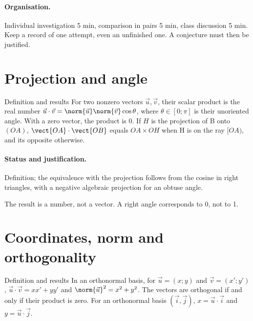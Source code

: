 \paragraph{Organisation.} Individual investigation 5 min, comparison in pairs 5 min, class discussion 5 min. Keep a record of one attempt, even an unfinished one. A conjecture must then be justified.
\section{Projection and angle}\label{C03-U1}
\begin{repere}{Definition and results}
For two nonzero vectors $\vec u,\vec v$, their scalar product is the real number $\vec u\cdot\vec v=\norm{\vec u}\norm{\vec v}\cos\theta$, where $\theta\in[0;\pi]$ is their unoriented angle. With a zero vector, the product is 0. If $H$ is the projection of B onto $(OA)$, $\vect{OA}\cdot\vect{OB}$ equals $OA\times OH$ when H is on the ray $[OA)$, and its opposite otherwise.
\end{repere}
\paragraph{Status and justification.} Definition; the equivalence with the projection follows from the cosine in right triangles, with a negative algebraic projection for an obtuse angle.
\label{C03-EX1}

\begin{erreur}The result is a number, not a vector. A right angle corresponds to 0, not to 1.\end{erreur}
\label{C03-AP1}
\section{Coordinates, norm and orthogonality}\label{C03-U2}
\begin{repere}{Definition and results}
In an orthonormal basis, for $\vec u=(x;y)$ and $\vec v=(x\prime;y\prime)$, $\vec u\cdot\vec v=xx\prime+yy\prime$ and $\norm{\vec u}^2=x^2+y^2$. The vectors are orthogonal if and only if their product is zero. For an orthonormal basis $(\vec i,\vec j)$, $x=\vec u\cdot\vec i$ and $y=\vec u\cdot\vec j$.
\end{repere}
